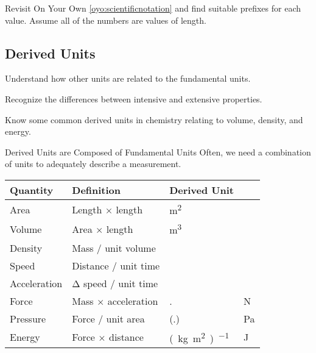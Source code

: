 \documentclass[10pt,letterpaper,twoside]{article}
\begin{document}
\begin{onyourown}%
	Revisit On Your Own \ref{oyo:scientificnotation} and find suitable
	prefixes for each value. Assume all of the numbers are values of length.
\end{onyourown}

\begin{frame}{}
	\section{Derived Units}
	\begin{learningobjectives}
		\item Understand how other units are related to the fundamental
			units.
		\item Recognize the differences between intensive and extensive
			properties.
		\item Know some common derived units in chemistry relating to
			volume, density, and energy.
	\end{learningobjectives}
\end{frame}

\begin{frame}{Derived Units are Composed of Fundamental Units}
	Often, we need a combination of units to adequately describe a
	measurement.

	\begin{center}
	\begin{tabular} {@{}*{3}{l}l}
		\toprule \bfseries
		Quantity     & \bfseries Definition                 &
		\multicolumn{2}{l}{\bfseries Derived Unit}                                                   \\
		\midrule
		Area         & Length $\times$ length     & \si{\meter\squared                                  }                              \\
		Volume       & Area $\times$ length       & \si{\meter\cubed                                    }                              \\
		Density      & Mass / unit volume         & \si{\kilo\gram\per{\meter\cubed}                    }                              \\
		Speed        & Distance / unit time       & \si{\meter\per{\second}                             }                              \\
		Acceleration & Δ speed / unit time        & \si{\meter\per{\second\squared}                     }                              \\
		Force        & Mass $\times$ acceleration &
		\si{\kilo\gram.\meter\per{\second\squared}          } & \textrightarrow\ \si{\newton} \\
		Pressure     & Force / unit area          &
		\si{\kilo\gram\per(\meter.\second\squared)          } & \textrightarrow\ \si{\pascal} \\
		Energy       & Force $\times$ distance    &
		\si{(\kilo\gram.\meter\squared)\per{\second\squared}} & \textrightarrow\ \si{\joule}  \\
		\bottomrule
	\end{tabular}
	\end{center}
\end{frame}
\end{document}
